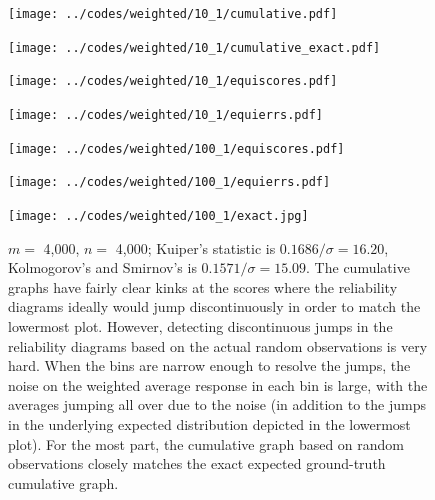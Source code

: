 \documentclass[]{fairmeta}
\begin{document}
\begin{figure}
\begin{centering}

\parbox{\imsize}{\texttt{[image: ../codes/weighted/10\_1/cumulative.pdf]}}
\quad\quad
\parbox{\imsize}{\texttt{[image: ../codes/weighted/10\_1/cumulative\_exact.pdf]}}

\vspace{\vertsep}

\parbox{\imsize}{\texttt{[image: ../codes/weighted/10\_1/equiscores.pdf]}}
\quad\quad
\parbox{\imsize}{\texttt{[image: ../codes/weighted/10\_1/equierrs.pdf]}}

\vspace{\vertsep}

\parbox{\imsize}{\texttt{[image: ../codes/weighted/100\_1/equiscores.pdf]}}
\quad\quad
\parbox{\imsize}{\texttt{[image: ../codes/weighted/100\_1/equierrs.pdf]}}

\vspace{\vertsep}

\parbox{\imsize}{\texttt{[image: ../codes/weighted/100\_1/exact.jpg]}}

\end{centering}
\caption{$m =$ 4,000, $n =$ 4,000;
         Kuiper's statistic is $0.1686 / \sigma = 16.20$,
         Kolmogorov's and Smirnov's is $0.1571 / \sigma = 15.09$.
         The cumulative graphs have fairly clear kinks
         at the scores where the reliability diagrams ideally would jump
         discontinuously in order to match the lowermost plot.
         However, detecting discontinuous jumps
         in the reliability diagrams based on the actual random observations
         is very hard. When the bins are narrow enough to resolve the jumps,
         the noise on the weighted average response in each bin is large,
         with the averages jumping all over due to the noise
         (in addition to the jumps in the underlying expected distribution
         depicted in the lowermost plot).
         For the most part, the cumulative graph based on random observations
         closely matches the exact expected ground-truth cumulative graph.
}
\label{ex1}
\end{figure}
\end{document}
